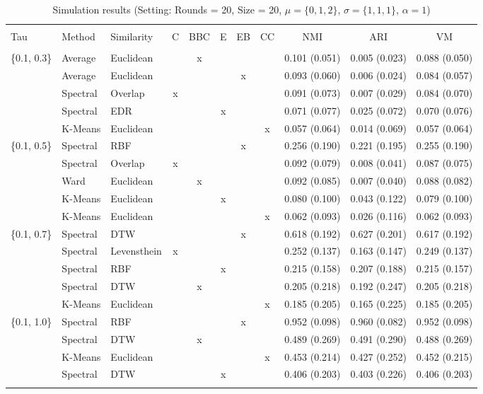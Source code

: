 \documentclass[12pt,a4paper,bibliography=totocnumbered,listof=totocnumbered]{scrartcl}
\begin{document}
{\begin{appendix}
\begin{table}[H] \centering 
	\label{} 
	\scriptsize
	\begin{tabularx}{\textwidth}{ lllcccccccc} \\
		\\[-1.8ex]	\toprule
		\\[-1.8ex] 
		Tau & Method & Similarity & C & BBC & E & EB & CC & NMI & ARI & VM \\ 
		\hline \\[-1.8ex] 
\{0.1, 0.3\} & Average & Euclidean &  & x &  &  &  & 0.101 (0.051) & 0.005 (0.023) & 0.088 (0.050) \\ 
& Average & Euclidean &  &  &  & x &  & 0.093 (0.060) & 0.006 (0.024) & 0.084 (0.057) \\ 
& Spectral & Overlap & x &  &  &  &  & 0.091 (0.073) & 0.007 (0.029) & 0.084 (0.070) \\ 
& Spectral & EDR &  &  & x &  &  & 0.071 (0.077) & 0.025 (0.072) & 0.070 (0.076) \\ 
& K-Means & Euclidean &  &  &  &  & x & 0.057 (0.064) & 0.014 (0.069) & 0.057 (0.064) \\ 
\{0.1, 0.5\} & Spectral & RBF &  &  &  & x &  & 0.256 (0.190) & 0.221 (0.195) & 0.255 (0.190) \\ 
& Spectral & Overlap & x &  &  &  &  & 0.092 (0.079) & 0.008 (0.041) & 0.087 (0.075) \\ 
& Ward & Euclidean &  & x &  &  &  & 0.092 (0.085) & 0.007 (0.040) & 0.088 (0.082) \\ 
& K-Means & Euclidean &  &  & x &  &  & 0.080 (0.100) & 0.043 (0.122) & 0.079 (0.100) \\ 
& K-Means & Euclidean &  &  &  &  & x & 0.062 (0.093) & 0.026 (0.116) & 0.062 (0.093) \\ 
\{0.1, 0.7\} & Spectral & DTW &  &  &  & x &  & 0.618 (0.192) & 0.627 (0.201) & 0.617 (0.192) \\ 
& Spectral & Levensthein & x &  &  &  &  & 0.252 (0.137) & 0.163 (0.147) & 0.249 (0.137) \\ 
& Spectral & RBF &  &  & x &  &  & 0.215 (0.158) & 0.207 (0.188) & 0.215 (0.157) \\ 
& Spectral & DTW &  & x &  &  &  & 0.205 (0.218) & 0.192 (0.247) & 0.205 (0.218) \\ 
& K-Means & Euclidean &  &  &  &  & x & 0.185 (0.205) & 0.165 (0.225) & 0.185 (0.205) \\ 
\{0.1, 1.0\} & Spectral & RBF &  &  &  & x &  & 0.952 (0.098) & 0.960 (0.082) & 0.952 (0.098) \\ 
& Spectral & DTW &  & x &  &  &  & 0.489 (0.269) & 0.491 (0.290) & 0.488 (0.269) \\ 
& K-Means & Euclidean &  &  &  &  & x & 0.453 (0.214) & 0.427 (0.252) & 0.452 (0.215) \\ 
& Spectral & DTW &  &  & x &  &  & 0.406 (0.203) & 0.403 (0.226) & 0.406 (0.203) \\ 
		\hline \\[-1.8ex] 
	\end{tabularx} 
		\caption{Simulation results (Setting: Rounds = 20, Size = 20, $\mu = \{0,1,2\}$, $\sigma =  \{1,1,1\}$, $\alpha = 1$)} 
			\label{tab:apstab5}
\end{table} 


\end{appendix}}
\end{document}

